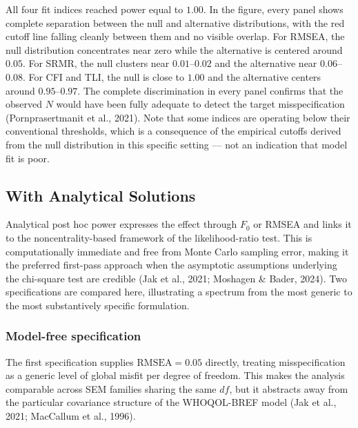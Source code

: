 \documentclass[
  letterpaper,
  DIV=11,
  numbers=noendperiod]{scrartcl}
\begin{document}
All four fit indices reached power equal to \(1.00\). In the figure,
every panel shows complete separation between the null and alternative
distributions, with the red cutoff line falling cleanly between them and
no visible overlap. For RMSEA, the null distribution concentrates near
zero while the alternative is centered around \(0.05\). For SRMR, the
null clusters near \(0.01\)--\(0.02\) and the alternative near
\(0.06\)--\(0.08\). For CFI and TLI, the null is close to \(1.00\) and
the alternative centers around \(0.95\)--\(0.97\). The complete
discrimination in every panel confirms that the observed \(N\) would
have been fully adequate to detect the target misspecification
(Pornprasertmanit et al., 2021). Note that some indices are operating
below their conventional thresholds, which is a consequence of the
empirical cutoffs derived from the null distribution in this specific
setting --- not an indication that model fit is poor.

\subsection{With Analytical Solutions}\label{with-analytical-solutions}

Analytical post hoc power expresses the effect through \(F_0\) or RMSEA
and links it to the noncentrality-based framework of the
likelihood-ratio test. This is computationally immediate and free from
Monte Carlo sampling error, making it the preferred first-pass approach
when the asymptotic assumptions underlying the chi-square test are
credible (Jak et al., 2021; Moshagen \& Bader, 2024). Two specifications
are compared here, illustrating a spectrum from the most generic to the
most substantively specific formulation.

\subsubsection{Model-free specification}\label{model-free-specification}

The first specification supplies \(\text{RMSEA} = 0.05\) directly,
treating misspecification as a generic level of global misfit per degree
of freedom. This makes the analysis comparable across SEM families
sharing the same \(df\), but it abstracts away from the particular
covariance structure of the WHOQOL-BREF model (Jak et al., 2021;
MacCallum et al., 1996).
\end{document}
